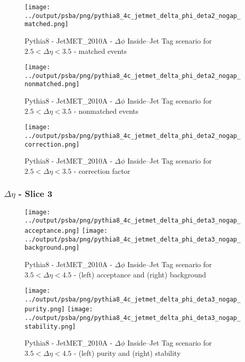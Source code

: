 \documentclass[11pt]{book}
\begin{document}
\begin{figure}[ht]
\centering
\texttt{[image: ../output/psba/png/pythia8\_4c\_jetmet\_delta\_phi\_deta2\_nogap\_matched.png]}
\caption{Pythia8 - JetMET\_2010A - $\Delta\phi$ Inside--Jet Tag scenario for $2.5 < \Delta\eta < 3.5$ - matched events}
\label{fig:p8_jetmet_delta_phi_deta2_nogap_matched}
\end{figure}

\begin{figure}[ht]
\centering
\texttt{[image: ../output/psba/png/pythia8\_4c\_jetmet\_delta\_phi\_deta2\_nogap\_nonmatched.png]}
\caption{Pythia8 - JetMET\_2010A - $\Delta\phi$ Inside--Jet Tag scenario for $2.5 < \Delta\eta < 3.5$ - nonmatched events}
\label{fig:p8_jetmet_delta_phi_deta2_nogap_nonmatched}
\end{figure}

\begin{figure}[ht]
\centering
\texttt{[image: ../output/psba/png/pythia8\_4c\_jetmet\_delta\_phi\_deta2\_nogap\_correction.png]}
\caption{Pythia8 - JetMET\_2010A - $\Delta\phi$ Inside--Jet Tag scenario for $2.5 < \Delta\eta < 3.5$ - correction factor}
\label{fig:p8_jetmet_delta_phi_deta2_nogap_correction}
\end{figure}

\clearpage
\subsubsection{$\Delta\eta$ - Slice 3}
\begin{figure}[ht]
\centering
\texttt{[image: ../output/psba/png/pythia8\_4c\_jetmet\_delta\_phi\_deta3\_nogap\_acceptance.png]}
\texttt{[image: ../output/psba/png/pythia8\_4c\_jetmet\_delta\_phi\_deta3\_nogap\_background.png]}
\caption{Pythia8 - JetMET\_2010A - $\Delta\phi$ Inside--Jet Tag scenario for $3.5 < \Delta\eta < 4.5$ - (left) acceptance and (right) background}
\label{fig:p8_jetmet_delta_phi_deta3_nogap_ab}
\end{figure}

\begin{figure}[ht]
\centering
\texttt{[image: ../output/psba/png/pythia8\_4c\_jetmet\_delta\_phi\_deta3\_nogap\_purity.png]}
\texttt{[image: ../output/psba/png/pythia8\_4c\_jetmet\_delta\_phi\_deta3\_nogap\_stability.png]}
\caption{Pythia8 - JetMET\_2010A - $\Delta\phi$ Inside--Jet Tag scenario for $3.5 < \Delta\eta < 4.5$ - (left) purity and (right) stability}
\label{fig:p8_jetmet_delta_phi_deta3_nogap_ps}
\end{figure}
\end{document}
